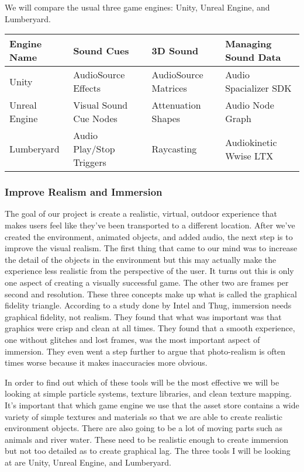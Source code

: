 \documentclass[10pt,journal,compsoc,onecolumn, draftclsnofoot]{IEEEtran}
\begin{document}
We will compare the usual three game engines: Unity, Unreal Engine, and Lumberyard.

\vspace{2mm}
\begin{table}[h!]
\centering
  \begin{tabu} to 1.0\textwidth { | X[l] || X[c] | X[c] | X[c] }
  \hline
  Engine Name & Sound Cues & 3D Sound & Managing Sound Data\\
  \hline
  Unity  & AudioSource Effects & AudioSource Matrices & Audio Spacializer SDK\\
  Unreal Engine & Visual Sound Cue Nodes & Attenuation Shapes & Audio Node Graph\\
  Lumberyard & Audio Play/Stop Triggers & Raycasting & Audiokinetic Wwise LTX\\
  \hline
  \end{tabu}
\end{table}
\vspace{2mm}


\subsubsection{Improve Realism and Immersion}
The goal of our project is create a realistic, virtual, outdoor experience that makes users feel like they’ve been transported to a different location.
After we’ve created the environment, animated objects, and added audio, the next step is to improve the visual realism.
The first thing that came to our mind was to increase the detail of the objects in the environment but this may actually make the experience less realistic from the perspective of the user.
It turns out this is only one aspect of creating a visually successful game.
The other two are frames per second and resolution.
These three concepts make up what is called the graphical fidelity triangle.
According to a study done by Intel and Thug\cite{michalak_lind_round1}, immersion needs graphical fidelity, not realism.
They found that what was important was that graphics were crisp and clean at all times.
They found that a smooth experience, one without glitches and lost frames, was the most important aspect of immersion.
They even went a step further to argue that photo-realism is often times worse because it makes inaccuracies more obvious.

In order to find out which of these tools will be the most effective we will be looking at simple particle systems, texture libraries, and clean texture mapping.
It’s important that which game engine we use that the asset store contains a wide variety of simple textures and materials so that we are able to create realistic environment objects.
There are also going to be a lot of moving parts such as animals and river water.
These need to be realistic enough to create immersion but not too detailed as to create graphical lag.
The three tools I will be looking at are Unity, Unreal Engine, and Lumberyard.
\end{document}

